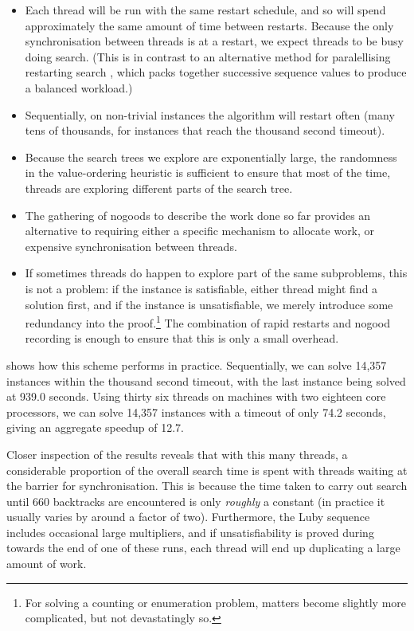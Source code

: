 \documentclass[runningheads]{llncs}
\begin{document}
\begin{itemize}
    \item Each thread will be run with the same restart schedule, and so will spend approximately
        the same amount of time between restarts. Because the only synchronisation between threads
        is at a restart, we expect threads to be busy doing search.  (This is in contrast
        to an alternative method for paralellising restarting search \cite{DBLP:conf/aaai/CireKS14},
        which packs together successive sequence values to produce a balanced workload.)
    \item Sequentially, on non-trivial instances the algorithm will restart often (many
        tens of thousands, for instances that reach the thousand second timeout).
    \item Because the search trees we explore are exponentially large, the randomness in the
        value-ordering heuristic is sufficient to ensure that most of the time, threads are
        exploring different parts of the search tree.
    \item The gathering of nogoods to describe the work done so far provides an alternative to
        requiring either a specific mechanism to allocate work, or expensive synchronisation between threads.
    \item If sometimes threads do happen to explore part of
        the same subproblems, this is not a problem: if the instance is satisfiable, either thread
        might find a solution first, and if the instance is unsatisfiable, we merely introduce some
        redundancy into the proof.\footnote{For solving a counting or enumeration problem,
        matters become slightly more complicated, but not devastatingly so.} The combination of
        rapid restarts and nogood recording is enough to ensure that this is only a small overhead.
\end{itemize}

 shows how this scheme performs in practice. Sequentially, we can solve 14,357
instances within the thousand second timeout, with the last instance being solved at 939.0 seconds.
Using thirty six threads on machines with two eighteen core processors, we can solve 14,357
instances with a timeout of only 74.2 seconds, giving an aggregate speedup
\cite{DBLP:conf/cpaior/HoffmannMNPRS018} of 12.7.

Closer inspection of the results reveals that with this many threads, a considerable proportion of
the overall search time is spent with threads waiting at the barrier for synchronisation. This is
because the time taken to carry out search until 660 backtracks are encountered is only
\emph{roughly} a constant (in practice it usually varies by around a factor of two). Furthermore,
the Luby sequence includes occasional large multipliers, and if unsatisfiability is proved during
towards the end of one of these runs, each thread will end up duplicating a large amount of work.
\end{document}
